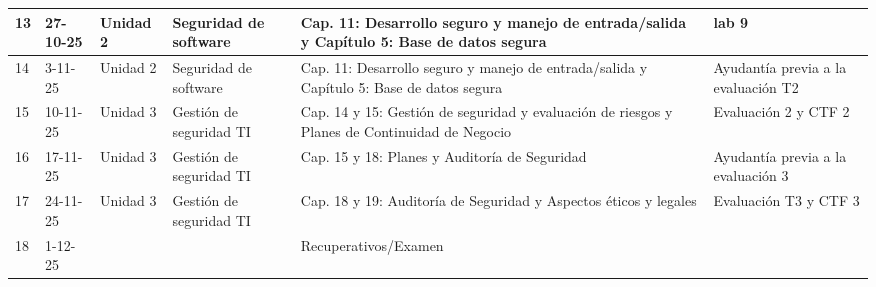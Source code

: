 \documentclass[12pt,a4paper]{article}
\begin{document}
\begin{landscape}
\begin{table}[h]
\begin{tabular}{|p{0.5cm}|p{1cm}|p{1cm}|p{5cm}|p{5cm}|p{2.5cm}|}
\hline
13 & 27-10-25 & Unidad 2 & Seguridad de software & Cap. 11: Desarrollo seguro y manejo de entrada/salida y Capítulo 5: Base de datos segura & lab 9 \\
\hline
14 & 3-11-25 & Unidad 2 & Seguridad de software & Cap. 11: Desarrollo seguro y manejo de entrada/salida y Capítulo 5: Base de datos segura & Ayudantía previa a la evaluación T2\\
\hline
15 & 10-11-25 & Unidad 3 & Gestión de seguridad TI & Cap. 14 y 15: Gestión de seguridad y evaluación de riesgos y Planes de Continuidad de Negocio & Evaluación 2 y CTF 2\\
\hline
16 & 17-11-25 & Unidad 3 & Gestión de seguridad TI & Cap. 15 y 18: Planes y Auditoría de Seguridad   & Ayudantía previa a la evaluación 3 \\
\hline
17 & 24-11-25 & Unidad 3 & Gestión de seguridad TI & Cap. 18 y 19: Auditoría de Seguridad y Aspectos éticos y legales &  Evaluación T3 y CTF 3 \\
\hline
18 & 1-12-25 & &  & Recuperativos/Examen &  \\
\hline
\end{tabular}
\end{table}

\vspace{2cm}

\end{landscape}
\end{document}
